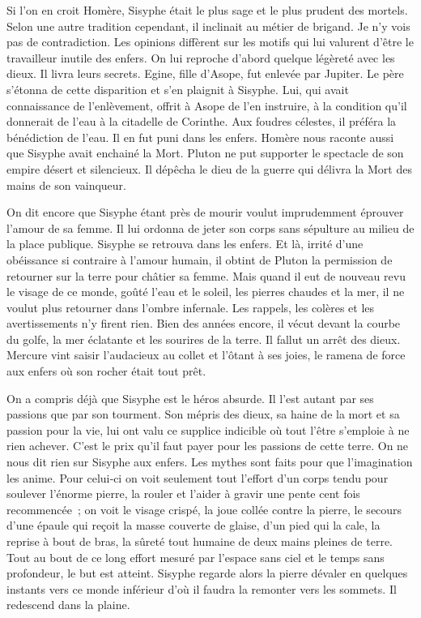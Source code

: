 \documentclass{book}
\begin{document}
Si l'on en croit Homère, Sisyphe était le plus sage et le plus prudent des mortels. Selon une autre tradition cependant, il inclinait au métier de brigand. Je n'y vois pas de contradiction. Les opinions diffèrent sur les motifs qui lui valurent d'être le travailleur inutile des enfers. On lui reproche d'abord quelque légèreté avec les dieux. Il livra leurs secrets. Egine, fille d'Asope, fut enlevée par Jupiter. Le père s'étonna de cette disparition et s'en plaignit à Sisyphe. Lui, qui avait connaissance de l'enlèvement, offrit à Asope de l'en instruire, à la condition qu'il donnerait de l'eau à la citadelle de Corinthe. Aux foudres célestes, il préféra la bénédiction de l'eau. Il en fut puni dans les enfers. Homère nous raconte aussi que Sisyphe avait enchainé la Mort. Pluton ne put supporter le spectacle de son empire désert et silencieux. Il dépêcha le dieu de la guerre qui délivra la Mort des mains de son vainqueur.

On dit encore que Sisyphe étant près de mourir voulut imprudemment éprouver l'amour de sa femme. Il lui ordonna de jeter son corps sans sépulture au milieu de la place publique. Sisyphe se retrouva dans les enfers. Et là, irrité d'une obéissance si contraire à l'amour humain, il obtint de Pluton la permission de retourner sur la terre pour châtier sa femme. Mais quand il eut de nouveau revu le visage de ce monde, goûté l'eau et le soleil, les pierres chaudes et la mer, il ne voulut plus retourner dans l'ombre infernale. Les rappels, les colères et les avertissements n'y firent rien. Bien des années encore, il vécut devant la courbe du golfe, la mer éclatante et les sourires de la terre. Il fallut un arrêt des dieux. Mercure vint saisir l'audacieux au collet et l'ôtant à ses joies, le ramena de force aux enfers où son rocher était tout prêt.

On a compris déjà que Sisyphe est le héros absurde. Il l'est autant par ses passions que par son tourment. Son mépris des dieux, sa haine de la mort et sa passion pour la vie, lui ont valu ce supplice indicible où tout l'être s'emploie à ne rien achever. C'est le prix qu'il faut payer pour les passions de cette terre. On ne nous dit rien sur Sisyphe aux enfers. Les mythes sont faits pour que l'imagination les anime. Pour celui‑ci on voit seulement tout l'effort d'un corps tendu pour soulever l'énorme pierre, la rouler et l'aider à gravir une pente cent fois recommencée ; on voit le visage crispé, la joue collée contre la pierre, le secours d'une épaule qui reçoit la masse couverte de glaise, d'un pied qui la cale, la reprise à bout de bras, la sûreté tout humaine de deux mains pleines de terre. Tout au bout de ce long effort mesuré par l'espace sans ciel et le temps sans profondeur, le but est atteint. Sisyphe regarde alors la pierre dévaler en quelques instants vers ce monde inférieur d'où il faudra la remonter vers les sommets. Il redescend dans la plaine.
\end{document}

